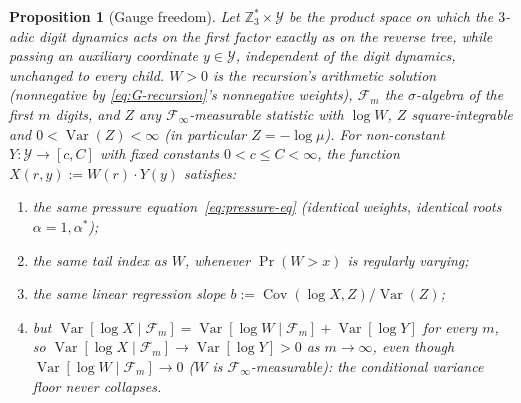 \documentclass[11pt]{article}
\newtheorem{proposition}[theorem]{Proposition}
\theoremstyle{definition}
\theoremstyle{remark}
\DeclareMathOperator{\Cov}{Cov}
\DeclareMathOperator{\Var}{Var}
\begin{document}
\begin{proposition}[Gauge freedom]\label{prop:gauge}
Let $\mathbb{Z}_3^\ast\times\mathcal{Y}$ be the product space on which
the $3$-adic digit dynamics acts on the first factor exactly as on the
reverse tree, while passing an auxiliary coordinate $y\in\mathcal{Y}$,
independent of the digit dynamics, unchanged to every child. $W>0$ is
the recursion's arithmetic solution (nonnegative by
\eqref{eq:G-recursion}'s nonnegative weights), $\mathcal{F}_m$ the
$\sigma$-algebra of the first $m$ digits, and $Z$ any
$\mathcal{F}_\infty$-measurable statistic with $\log W$, $Z$
square-integrable and $0<\Var(Z)<\infty$ (in particular $Z=-\log\mu$).
For non-constant $Y:\mathcal{Y}\to[c,C]$ with fixed constants
$0<c\le C<\infty$, the function $X(r,y):=W(r)\cdot Y(y)$ satisfies:
\begin{enumerate}[label=(\alph*)]
\item the same pressure equation~\eqref{eq:pressure-eq} (identical
  weights, identical roots $\alpha=1,\alpha^\ast$);
\item the same tail index as $W$, whenever $\Pr(W>x)$ is regularly
  varying;
\item the same linear regression slope $b:=\Cov(\log X,Z)/\Var(Z)$;
\item but $\Var[\log X\mid\mathcal{F}_m]=\Var[\log W\mid\mathcal{F}_m]
  +\Var[\log Y]$ for every $m$, so
  $\Var[\log X\mid\mathcal{F}_m]\to\Var[\log Y]>0$ as $m\to\infty$,
  even though $\Var[\log W\mid\mathcal{F}_m]\to0$ ($W$ is
  $\mathcal{F}_\infty$-measurable): the conditional variance floor
  never collapses.
\end{enumerate}
\end{proposition}
\end{document}
